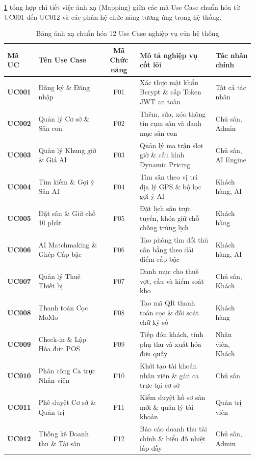 \cref{tab:usecase_mapping} tổng hợp chi tiết việc ánh xạ (Mapping) giữa các mã Use Case chuẩn hóa từ UC001 đến UC012 và các phân hệ chức năng tương ứng trong hệ thống.

\begin{table}[htbp]
\centering
\small
\caption{Bảng ánh xạ chuẩn hóa 12 Use Case nghiệp vụ của hệ thống}
\label{tab:usecase_mapping}
\begin{tabularx}{\textwidth}{l p{3.2cm} c X l}
    \toprule
    \textbf{Mã UC} & \textbf{Tên Use Case} & \textbf{Mã Chức năng} & \textbf{Mô tả nghiệp vụ cốt lõi} & \textbf{Tác nhân chính} \\
    \midrule
    \textbf{UC001} & Đăng ký \& Đăng nhập & F01 & Xác thực mật khẩu Bcrypt \& cấp Token JWT an toàn & Tất cả tác nhân \\
    \textbf{UC002} & Quản lý Cơ sở \& Sân con & F02 & Thêm, sửa, xóa thông tin cụm sân và danh mục sân con & Chủ sân, Admin \\
    \textbf{UC003} & Quản lý Khung giờ \& Giá AI & F03 & Quản lý ma trận slot giờ \& cấu hình Dynamic Pricing & Chủ sân, AI Engine \\
    \textbf{UC004} & Tìm kiếm \& Gợi ý Sân AI & F04 & Tìm sân theo vị trí địa lý GPS \& bộ lọc gợi ý AI & Khách hàng, AI \\
    \textbf{UC005} & Đặt sân \& Giữ chỗ 10 phút & F05 & Đặt lịch sân trực tuyến, khóa giữ chỗ chống trùng lịch & Khách hàng \\
    \textbf{UC006} & AI Matchmaking \& Ghép Cấp bậc & F06 & Tạo phòng tìm đối thủ cân bằng theo dải điểm cấp bậc & Khách hàng, AI \\
    \textbf{UC007} & Quản lý Thuê Thiết bị & F07 & Danh mục cho thuê vợt, cầu và kiểm soát kho & Chủ sân, Khách \\
    \textbf{UC008} & Thanh toán Cọc MoMo & F08 & Tạo mã QR thanh toán cọc \& đối soát chữ ký số & Khách hàng \\
    \textbf{UC009} & Check-in \& Lập Hóa đơn POS & F09 & Tiếp đón khách, tính phụ thu và xuất hóa đơn quầy & Nhân viên, Khách \\
    \textbf{UC010} & Phân công Ca trực Nhân viên & F10 & Khởi tạo tài khoản nhân viên \& gán ca trực tại cơ sở & Chủ sân \\
    \textbf{UC011} & Phê duyệt Cơ sở \& Quản trị & F11 & Kiểm duyệt hồ sơ sân mới \& quản lý tài khoản & Quản trị viên \\
    \textbf{UC012} & Thống kê Doanh thu \& Tải sân & F12 & Báo cáo doanh thu tài chính \& biểu đồ nhiệt lấp đầy & Chủ sân, Admin \\
    \bottomrule
\end{tabularx}
\end{table}

